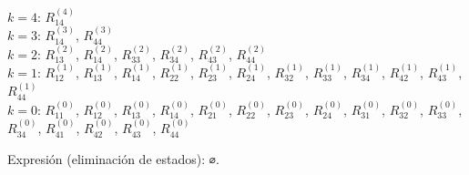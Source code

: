 \documentclass[11pt]{article}
\begin{document}
$k = 4$: $R_{14}^{(4)}$ \\
$k = 3$: $R_{14}^{(3)}$, $R_{44}^{(3)}$ \\
$k = 2$: $R_{13}^{(2)}$, $R_{14}^{(2)}$, $R_{33}^{(2)}$, $R_{34}^{(2)}$, $R_{43}^{(2)}$, $R_{44}^{(2)}$ \\
$k = 1$: $R_{12}^{(1)}$, $R_{13}^{(1)}$, $R_{14}^{(1)}$, $R_{22}^{(1)}$, $R_{23}^{(1)}$, $R_{24}^{(1)}$, $R_{32}^{(1)}$, $R_{33}^{(1)}$, $R_{34}^{(1)}$, $R_{42}^{(1)}$, $R_{43}^{(1)}$, $R_{44}^{(1)}$ \\
$k = 0$: $R_{11}^{(0)}$, $R_{12}^{(0)}$, $R_{13}^{(0)}$, $R_{14}^{(0)}$, $R_{21}^{(0)}$, $R_{22}^{(0)}$, $R_{23}^{(0)}$, $R_{24}^{(0)}$, $R_{31}^{(0)}$, $R_{32}^{(0)}$, $R_{33}^{(0)}$, $R_{34}^{(0)}$, $R_{41}^{(0)}$, $R_{42}^{(0)}$, $R_{43}^{(0)}$, $R_{44}^{(0)}$


\resp Expresión (eliminación de estados): \texttt{∅}.


\end{document}
